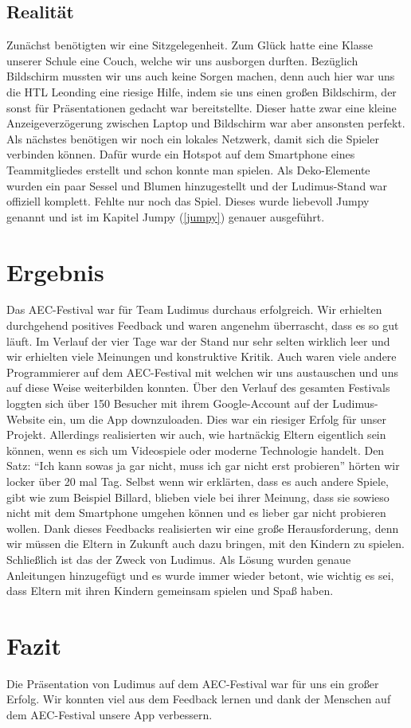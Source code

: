 \subsection{Realität}
Zunächst benötigten wir eine Sitzgelegenheit. Zum Glück hatte eine Klasse unserer Schule eine Couch, welche wir uns ausborgen durften. Bezüglich Bildschirm mussten wir uns auch keine Sorgen machen, denn auch hier war uns die HTL Leonding eine riesige Hilfe, indem sie uns einen großen Bildschirm, der sonst für Präsentationen gedacht war bereitstellte. Dieser hatte zwar eine kleine Anzeigeverzögerung zwischen Laptop und Bildschirm war aber ansonsten perfekt. Als nächstes benötigen wir noch ein lokales Netzwerk, damit sich die Spieler verbinden können. Dafür wurde ein Hotspot auf dem Smartphone eines Teammitgliedes erstellt und schon konnte man spielen. Als Deko-Elemente wurden ein paar Sessel und Blumen hinzugestellt und der Ludimus-Stand war offiziell komplett. Fehlte nur noch das Spiel. Dieses wurde liebevoll Jumpy genannt und ist im Kapitel Jumpy (\ref{jumpy}) genauer ausgeführt.
\section{Ergebnis}
Das AEC-Festival war für Team Ludimus durchaus erfolgreich. Wir erhielten durchgehend positives Feedback und waren angenehm überrascht, dass es so gut läuft. Im Verlauf der vier Tage war der Stand nur sehr selten wirklich leer und wir erhielten viele Meinungen und konstruktive Kritik. Auch waren viele andere Programmierer auf dem AEC-Festival mit welchen wir uns austauschen und uns auf diese Weise weiterbilden konnten. Über den Verlauf des gesamten Festivals loggten sich über 150 Besucher mit ihrem Google-Account auf der Ludimus-Website ein, um die App downzuloaden. Dies war ein riesiger Erfolg für unser Projekt. Allerdings realisierten wir auch, wie hartnäckig Eltern eigentlich sein können, wenn es sich um Videospiele oder moderne Technologie handelt. Den Satz: “Ich kann sowas ja gar nicht, muss ich gar nicht erst probieren” hörten wir locker über 20 mal Tag. Selbst wenn wir erklärten, dass es auch andere Spiele, gibt wie zum Beispiel Billard, blieben viele bei ihrer Meinung, dass sie sowieso nicht mit dem Smartphone umgehen können und es lieber gar nicht probieren wollen. Dank dieses Feedbacks realisierten wir eine große Herausforderung, denn wir müssen die Eltern in Zukunft auch dazu bringen, mit den Kindern zu spielen. Schließlich ist das der Zweck von Ludimus. Als Lösung wurden genaue Anleitungen hinzugefügt und es wurde immer wieder betont, wie wichtig es sei, dass Eltern mit ihren Kindern gemeinsam spielen und Spaß haben.
\section{Fazit}
Die Präsentation von Ludimus auf dem AEC-Festival war für uns ein großer Erfolg. Wir konnten viel aus dem Feedback lernen und dank der Menschen auf dem AEC-Festival unsere App verbessern.
